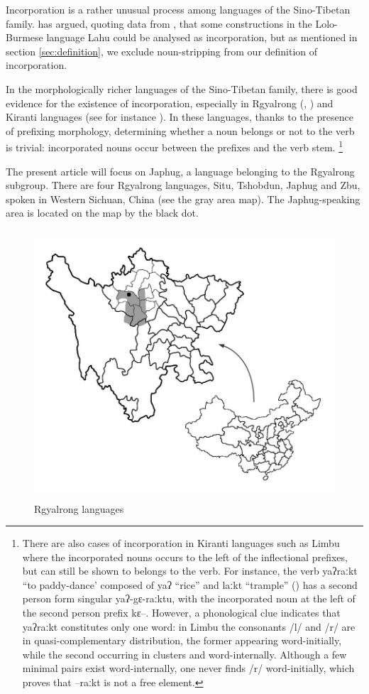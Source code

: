 \documentclass[oldfontcommands,oneside,a4paper,11pt]{article}
\newcommand{\ipa}[1]{{\phon #1}} %
\begin{document}
Incorporation is a rather unusual process among languages of the Sino-Tibetan family.   \citet[853]{mithun84incorp} has argued, quoting data from \citet[309]{matisoff73lahu}, that some constructions in the Lolo-Burmese language Lahu could be analysed as incorporation, but as mentioned in section \ref{sec:definition}, we exclude noun-stripping from our definition of incorporation.

In the morphologically richer  languages of the Sino-Tibetan family, there is good evidence for the existence of incorporation, especially in Rgyalrong  (\citealt{jacques04these}, \citealt{jacques11demotion}) and Kiranti languages (see for instance \citealt[92]{schackow08puma}). In these languages, thanks to the presence of  prefixing morphology, determining whether a noun belongs or not to the verb is trivial: incorporated nouns  occur  between the prefixes and the verb stem. \footnote{There are also cases of incorporation in Kiranti languages such as Limbu where the incorporated nouns occurs to the left of the inflectional prefixes, but can still be shown to belongs to the verb. For instance, the verb \ipa{yaʔraːkt} ``to paddy-dance' composed of \ipa{yaʔ} ``rice'' and \ipa{laːkt} ``trample'' (\citealt{michailovsky02dico}) has a second person form singular \ipa{yaʔ-gɛ-raːktu}, with the incorporated noun at the left of the second person prefix \ipa{kɛ}--. However,  a phonological clue indicates that \ipa{yaʔraːkt} constitutes only one word: in Limbu the consonants /l/ and  /r/ are in quasi-complementary distribution, the former appearing word-initially, while the second occurring in clusters and word-internally. Although a few minimal pairs exist word-internally, one never finds /r/ word-initially, which proves that \ipa{--raːkt} is not a free element.}




The present article will focus on Japhug, a language belonging to the  Rgyalrong subgroup. There are four Rgyalrong languages, Situ, Tshobdun, Japhug and Zbu, spoken in Western Sichuan, China (see the gray area map). The Japhug-speaking area is located on the map by the black dot. 

\begin{figure}[H]
\centering
\includegraphics[height=100mm]{carte.JPG}
\caption{Rgyalrong languages}
\label{fig:rgyalrong}
\end{figure}
\end{document}
